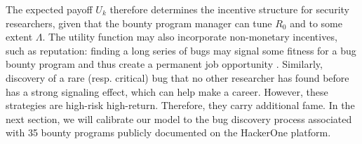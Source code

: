 The expected payoff $U_k$ therefore determines the incentive structure for security researchers, given that the bounty program manager can tune $R_0$ and to some extent $\Lambda$. The utility function may also incorporate non-monetary incentives, such as reputation: finding a long series of bugs may signal some fitness for a bug bounty program and  thus create a permanent job opportunity \cite{moussouris2016}. Similarly, discovery of a rare (resp. critical) bug that no other researcher has found before has a strong signaling effect, which can help make a career. However, these strategies are high-risk high-return. Therefore, they carry additional fame. In the next section, we will calibrate our model to the bug discovery process associated with 35 bounty programs publicly documented on the HackerOne platform.





